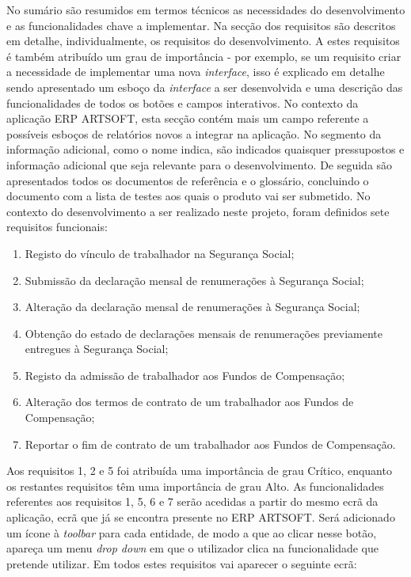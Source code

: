 \documentclass[sigplan]{acmart}
\begin{document}
No sumário são resumidos em termos técnicos as necessidades do desenvolvimento e as funcionalidades chave a implementar. Na secção dos requisitos são descritos em detalhe, individualmente, os requisitos do desenvolvimento. A estes requisitos é também atribuído um grau de importância - por exemplo, se um requisito criar a necessidade de implementar uma nova \textit{interface}, isso é explicado em detalhe sendo apresentado um esboço da \textit{interface} a ser desenvolvida e uma descrição das funcionalidades de todos os botões e campos interativos. No contexto da aplicação ERP ARTSOFT, esta secção contém mais um campo referente a possíveis esboços de relatórios novos a integrar na aplicação. No segmento da informação adicional, como o nome indica, são indicados quaisquer pressupostos e informação adicional que seja relevante para o desenvolvimento. De seguida são apresentados todos os documentos de referência e o glossário, concluindo o documento com a lista de testes aos quais o produto vai ser submetido. No contexto do desenvolvimento a ser realizado neste projeto, foram definidos sete requisitos funcionais:
\begin{enumerate}
  \item Registo do vínculo de trabalhador na Segurança Social;
  \item Submissão da declaração mensal de renumerações à Segurança Social;
  \item Alteração da declaração mensal de renumerações à Segurança Social;
  \item Obtenção do estado de declarações mensais de renumerações previamente entregues à Segurança Social;
  \item Registo da admissão de trabalhador aos Fundos de Compensação;
  \item Alteração dos termos de contrato de um trabalhador aos Fundos de Compensação;
  \item Reportar o fim de contrato de um trabalhador aos Fundos de Compensação.
\end{enumerate}
Aos requisitos 1, 2 e 5 foi atribuída uma importância de grau Crítico, enquanto os restantes requisitos têm uma importância de grau Alto. As funcionalidades referentes aos requisitos 1, 5, 6 e 7 serão acedidas a partir do mesmo ecrã da aplicação, ecrã que já se encontra presente no ERP ARTSOFT. Será adicionado um ícone à \textit{toolbar} para cada entidade, de modo a que ao clicar nesse botão, apareça um menu \textit{drop down} em que o utilizador clica na funcionalidade que pretende utilizar. Em todos estes requisitos vai aparecer o seguinte ecrã:
\end{document}
